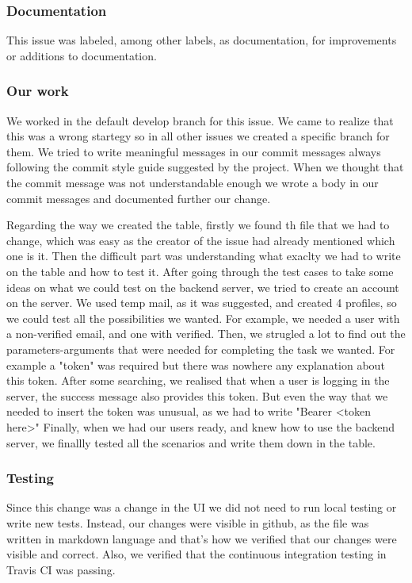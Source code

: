 \documentclass{article}
\begin{document}
\subsubsection{Documentation}
This issue was labeled, among other labels, as documentation, for improvements or additions to documentation.
\subsubsection{Our work}
\hspace{0.5cm}We worked in the default develop branch for this issue. We came to realize that this was a wrong startegy so in all other issues we created a specific branch for them. We tried to write meaningful messages in our commit messages always following the commit style guide suggested by the project. When we thought that the commit message was not understandable enough we wrote a body in our commit messages and documented further our change.

Regarding the way we created the table, firstly we found th file that we had to change, which was easy as the creator of the issue had already mentioned which one is it. Then the difficult part was understanding what exaclty we had to write on the table and how to test it. After going through the test cases to take some ideas on what we could test on the backend server, we tried to create an account on the server. We used temp mail, as it was suggested, and created 4 profiles, so we could test all the possibilities we wanted. For example, we needed a user with a non-verified email, and one with verified. 
Then, we strugled a lot to find out the parameters-arguments that were needed for completing the task we wanted. For example a "token" was required but there was nowhere any explanation about this token. After some searching, we realised that when a user is logging in the server, the success message also provides this token. But even the way that we needed to insert the token was unusual, as we had to write "Bearer <token here>"
Finally, when we had our users ready, and knew how to use the backend server, we finallly tested all the scenarios and write them down in the table.

\subsubsection{Testing}
\hspace{0.5cm}Since this change was a change in the UI we did not need to run local testing or write new tests. Instead, our changes were visible in github, as the file was written in markdown language and that's how we verified that our changes were visible and correct. Also, we verified that the continuous integration testing in Travis CI was passing. 
\end{document}
